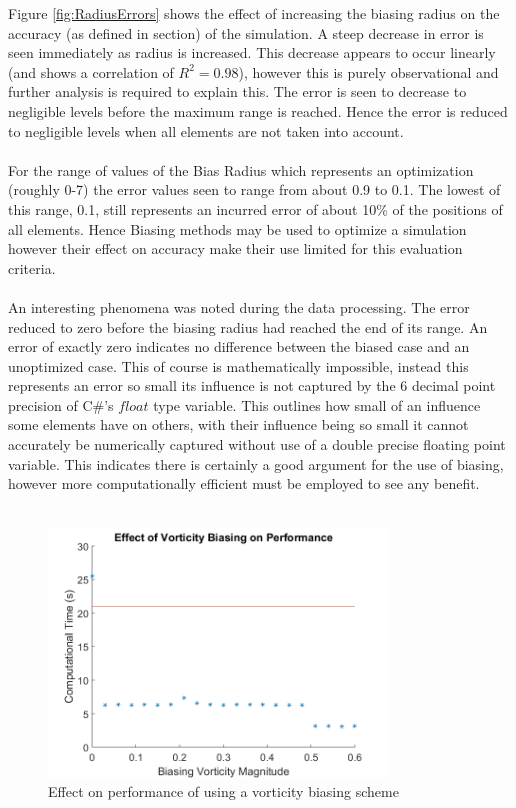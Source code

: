 Figure \ref{fig:RadiusErrors} shows the effect of increasing the biasing radius on the accuracy (as defined in section) of the simulation. A steep decrease in error is seen immediately as radius is increased. This decrease appears to occur linearly (and shows a correlation of $R^2=0.98$), however this is purely observational and further analysis is required to explain this. The error is seen to decrease to negligible levels before the maximum range is reached. Hence the error is reduced to negligible levels when all elements are not taken into account. 
\\\\
For the range of values of the Bias Radius which represents an optimization (roughly 0-7) the error values seen to range from about 0.9 to 0.1. The lowest of this range, 0.1, still represents an incurred error of about 10\% of the positions of all elements. Hence Biasing methods may be used to optimize a simulation however their effect on accuracy make their use limited for this evaluation criteria.
\\\\
An interesting phenomena was noted during the data processing. The error reduced to zero before the biasing radius had reached the end of its range. An error of exactly zero indicates no difference between the biased case and an unoptimized case. This of course is mathematically impossible, instead this represents an error so small its influence is not captured by the 6 decimal point precision of C\#'s $float$ type variable. This outlines how small of an influence some elements have on others, with their influence being so small it cannot accurately be numerically captured without use of a double precise floating point variable. This indicates there is certainly a good argument for the use of biasing, however more computationally efficient must be employed to see any benefit.
\\\\
\begin{figure}[H]
\centering
\includegraphics[width=0.8\textwidth]{Figures/VorticityBiasTimes.png}
\caption{\label{fig:VortBiasTimes} Effect on performance of using a vorticity biasing scheme}
\end{figure} 

